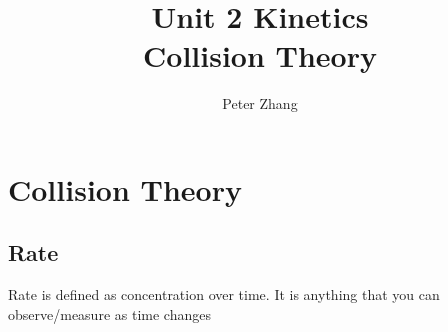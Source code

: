 \documentclass{article}
\title{Unit 2 Kinetics\\Collision Theory}
\author{Peter Zhang}
\begin{document}
\maketitle
\newpage
\tableofcontents
\newpage


\section{Collision Theory}

\subsection{Rate}
Rate is defined as concentration over time. It is anything that you can observe/measure as time changes

\\

\end{document}

